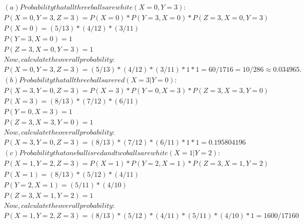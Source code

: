 \documentclass[journal,12pt,twocolumn]{IEEEtran}
\theoremstyle{remark}
\begin{document}
\begin{align}
    
(a) Probability that all three balls are white (X = 0, Y = 3):\\
P(X = 0, Y = 3, Z = 3) = P(X = 0) * P(Y = 3, X = 0) * P(Z = 3, X = 0, Y = 3)\\
P(X = 0) = (5/13) * (4/12) * (3/11)\\
P(Y = 3, X = 0) = 1\\ 
P(Z = 3, X = 0, Y = 3) = 1 \\
Now, calculate the overall probability:\\
P(X = 0, Y = 3, Z = 3) = (5/13) * (4/12) * (3/11) * 1 * 1 = 60/1716 = 10/286 ≈ 0.034965.\\
(b) Probability that all three balls are red (X = 3|Y = 0):\\
P(X = 3, Y = 0, Z = 3) = P(X = 3) * P(Y = 0 ,X = 3) * P(Z = 3, X = 3, Y = 0)\\
P(X = 3) = (8/13) * (7/12) * (6/11)\\  
P(Y = 0, X = 3) = 1 \\
P(Z = 3, X = 3, Y = 0) = 1  \\
Now, calculate the overall probability:\\
P(X = 3, Y = 0, Z = 3) = (8/13) * (7/12) * (6/11) * 1 * 1 = 0.195804196\\
(c) Probability that one ball is red and two balls are white (X = 1 | Y = 2):\\
P(X = 1, Y = 2, Z = 3) = P(X = 1) * P(Y = 2, X = 1) * P(Z = 3, X = 1, Y = 2)\\
P(X = 1) = (8/13) * (5/12) * (4/11)\\  
P(Y = 2, X = 1) = (5/11) * (4/10)\\ 
P(Z = 3, X = 1, Y = 2) = 1 \\ 
Now, 
calculate the overall probability:\\
P(X = 1, Y = 2, Z = 3) = (8/13) * (5/12) * (4/11) * (5/11) * (4/10) * 1 = 1600/17160 \\
\end{align}
\end{document}
